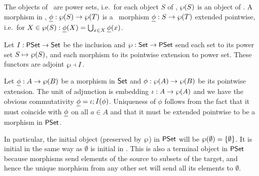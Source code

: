 \documentclass[10pt]{article}
\begin{document}
\begin{Definition}
The objects of \PSt\ are power sets, i.e.\ for each object $S$ of
\Set, $\wp(S)$ is an object of \PSt.  A morphism in \PSt,
$\underline {\phi}:\wp(S)\rightarrow \wp(T)$ is a \Set\ morphism
$\underline {\phi}:S\rightarrow\wp(T)$ extended pointwise, i.e.\ for
$X\in\wp(S) : \underline {\phi}(X) = \bigcup_{x\in X}\underline {\phi}(x)$.
\end{Definition}

\begin{Prop}
\label{le:adjSPS}
Let $I:\mbox{\rm\sf PSet}\rightarrow\mbox{\rm\sf Set}$ be the inclusion and $\wp:\mbox{\rm\sf Set}\rightarrow\mbox{\rm\sf PSet}$ send
each set to its power set $S\mapsto\wp(S)$, and each morphism to its
pointwise extension to power set. These functors are adjoint
$\wp\mathrel{\scriptstyle\dashv} I$.
\end{Prop}

\begin{Proof}
Let $\underline {\phi}:A\rightarrow\wp(B)$ be a morphism in $\mbox{\rm\sf Set}$ and
$\phi:\wp(A)\rightarrow\wp(B)$ be its pointwise extension. The unit of
adjunction is embedding $\iota:A\rightarrow\wp(A)$ and we have the obvious
commutativity $\underline {\phi} = \iota;I(\phi)$. Uniqueness of $\phi$
follows from the fact that it must coincide with $\underline {\phi}$ on all
$a\in A$ and that it must be extended pointwise to be a morphism in
$\mbox{\rm\sf PSet}$.
\end{Proof}

%

\noindent
In particular, the initial object (preserved by $\wp$) in $\mbox{\rm\sf PSet}$
will be $\wp(\emptyset)=\{\emptyset\}$.  It is initial in the same way as $\emptyset$
is initial in \Set.  This is also a terminal object in $\mbox{\rm\sf PSet}$ because
morphisms send elements of the source to subsets of the target, and
hence the unique morphism from any other set will send all its
elements to $\emptyset$.
\end{document}
